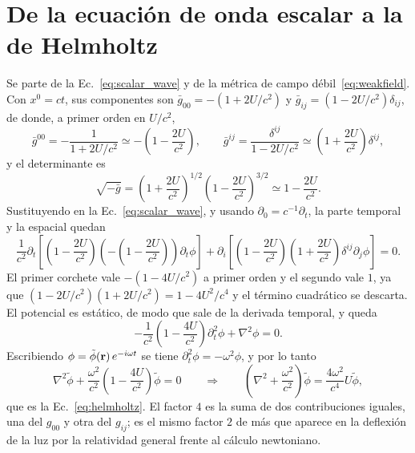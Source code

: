 \documentclass[11pt,a4paper,openany]{book}
\begin{document}
\section{De la ecuaci\'on de onda escalar a la de Helmholtz}
\label{ap:helmholtz}

Se parte de la Ec.~\eqref{eq:scalar_wave} y de la m\'etrica de campo
d\'ebil~\eqref{eq:weakfield}. Con $x^{0}=ct$, sus componentes son
$\bar g_{00}=-(1+2U/c^{2})$ y $\bar g_{ij}=(1-2U/c^{2})\delta_{ij}$, de donde,
a primer orden en $U/c^{2}$,
\begin{equation}
  \bar g^{00}=-\frac{1}{1+2U/c^{2}}\simeq-\left(1-\frac{2U}{c^{2}}\right),
  \qquad
  \bar g^{ij}=\frac{\delta^{ij}}{1-2U/c^{2}}
  \simeq\left(1+\frac{2U}{c^{2}}\right)\delta^{ij} ,
  \label{eq:inverse_metric}
\end{equation}
y el determinante es
\begin{equation}
  \sqrt{-\bar g}=\left(1+\frac{2U}{c^{2}}\right)^{1/2}
  \left(1-\frac{2U}{c^{2}}\right)^{3/2}\simeq1-\frac{2U}{c^{2}} .
  \label{eq:sqrtg}
\end{equation}
Sustituyendo en la Ec.~\eqref{eq:scalar_wave}, y usando
$\partial_0=c^{-1}\partial_t$, la parte temporal y la espacial quedan
\begin{equation}
  \frac{1}{c^{2}}\partial_t\!\left[\left(1-\frac{2U}{c^{2}}\right)
  \left(-\left(1-\frac{2U}{c^{2}}\right)\right)\partial_t\phi\right]
  +\partial_i\!\left[\left(1-\frac{2U}{c^{2}}\right)
  \left(1+\frac{2U}{c^{2}}\right)\delta^{ij}\partial_j\phi\right]=0 .
  \label{eq:helmholtz_step}
\end{equation}
El primer corchete vale $-(1-4U/c^{2})$ a primer orden y el segundo vale $1$,
ya que $(1-2U/c^{2})(1+2U/c^{2})=1-4U^{2}/c^{4}$ y el t\'ermino cuadr\'atico se
descarta. El potencial es est\'atico, de modo que sale de la derivada
temporal, y queda
\begin{equation}
  -\frac{1}{c^{2}}\left(1-\frac{4U}{c^{2}}\right)\partial_t^{2}\phi
  +\nabla^{2}\phi=0 .
\end{equation}
Escribiendo $\phi=\tilde\phi(\vb r)\,e^{-i\omega t}$ se tiene
$\partial_t^{2}\phi=-\omega^{2}\phi$, y por lo tanto
\begin{equation}
  \nabla^{2}\tilde\phi
  +\frac{\omega^{2}}{c^{2}}\left(1-\frac{4U}{c^{2}}\right)\tilde\phi=0
  \qquad\Longrightarrow\qquad
  \left(\nabla^{2}+\frac{\omega^{2}}{c^{2}}\right)\tilde\phi
  =\frac{4\omega^{2}}{c^{4}}U\tilde\phi ,
\end{equation}
que es la Ec.~\eqref{eq:helmholtz}. El factor $4$ es la suma de dos
contribuciones iguales, una del $g_{00}$ y otra del $g_{ij}$; es el mismo
factor $2$ de m\'as que aparece en la deflexi\'on de la luz por la relatividad
general frente al c\'alculo newtoniano.
\end{document}

